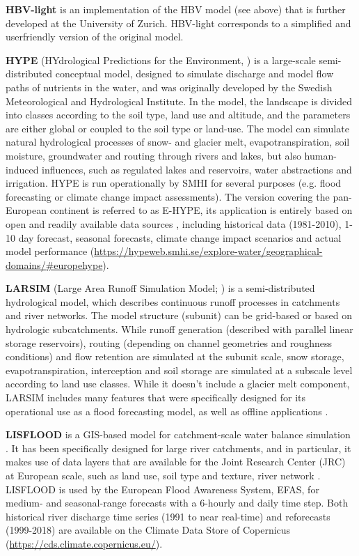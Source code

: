 \documentclass[10pt,a4paper]{article}
\begin{document}
\textbf{HBV-light} \citep{Seibert_2012} is an implementation of the HBV model (see above) that is further developed at the University of Zurich. HBV-light corresponds to a simplified and userfriendly version of the original model. 

\textbf{HYPE} (HYdrological Predictions for the Environment, \citealp{Lindstr_m_2010}) is a large-scale semi-distributed conceptual model, designed to simulate discharge and model flow paths of nutrients in the water, and was originally developed by the Swedish Meteorological and Hydrological Institute. In the model, the landscape is divided into classes according to the soil type, land use and altitude, and the parameters are either global or coupled to the soil type or land-use. The model can simulate natural hydrological processes of snow- and glacier melt, evapotranspiration, soil moisture, groundwater and routing through rivers and lakes, but also human-induced influences, such as regulated lakes and reservoirs, water abstractions and irrigation. HYPE is run operationally by SMHI for several purposes (e.g. flood forecasting or climate change impact assessments). The version covering the pan-European continent is referred to as E-HYPE, its application is entirely based on open and readily available data sources \citep{Donnelly_2015}, including historical data (1981-2010), 1-10 day forecast, seasonal forecasts, climate change impact scenarios and actual model performance (\url{https://hypeweb.smhi.se/explore-water/geographical-domains/\#europehype}).

\textbf{LARSIM} (Large Area Runoff Simulation Model; \citealp{Ludwig2006}) is a semi-distributed hydrological model, which describes continuous runoff processes in catchments and river networks. The model structure (subunit) can be grid-based or based on hydrologic subcatchments. While runoff generation (described with parallel linear storage reservoirs), routing (depending on channel geometries and roughness conditions) and flow retention are simulated at the subunit scale, snow storage, evapotranspiration, interception and soil storage are simulated at a subscale level according to land use classes. While it doesn't include a glacier melt component, LARSIM includes many features that were specifically designed for its operational use as a flood forecasting model, as well as offline applications \citep{m2017}. 

\textbf{LISFLOOD} is a GIS-based model for catchment-scale water balance simulation \citep{vanderkniff2010}. It has been specifically designed for large river catchments, and in particular, it makes use of data layers that are available for the Joint Research Center (JRC) at European scale, such as land use, soil type and texture, river network \citep{Thielen_2009}. LISFLOOD is used by the European Flood Awareness System, EFAS, for medium- and seasonal-range forecasts with a 6-hourly and daily time step. Both historical river discharge time series (1991 to near real-time) and reforecasts (1999-2018) are available on the Climate Data Store of Copernicus (\url{https://cds.climate.copernicus.eu/}). 
\end{document}
